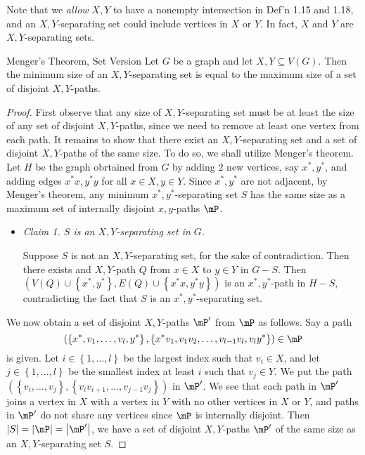 \documentclass[co342]{subfiles}
\begin{document}
    \noindent Note that we \textit{allow} $X,Y$ to have a nonempty intersection in Def'n 1.15 and 1.18, and an $X,Y$-separating set could include vertices in $X$ or $Y$. In fact, $X$ and $Y$ are $X,Y$-separating sets.

    \begin{theorem}{Menger's Theorem, Set Version}
        Let $G$ be a graph and let $X,Y\subseteq V\left( G \right)$. Then the minimum size of an $X,Y$-separating set is equal to the maximum size of a set of disjoint $X,Y$-paths.
    \end{theorem}

    \begin{proof}
        First observe that any size of $X,Y$-separating set must be at least the size of any set of disjoint $X,Y$-paths, since we need to remove at least one vertex from each path. It remains to show that there exist an $X,Y$-separating set and a set of disjoint $X,Y$-paths of the same size. To do so, we shall utilize Menger's theorem. Let $H$ be the graph obrtained from $G$ by adding $2$ new vertices, say $x^{*},y^{*}$, and adding edges $x^{*}x, y^{*}y$ for all $x\in X, y\in Y$. Since $x^{*},y^{*}$ are not adjacent, by Menger's theorem, any minimum $x^{*},y^{*}$-separating set $S$ has the same size as a maximum set of internally disjoint $x,y$-paths $\mP$.
        \begin{itemize}
            \item \textit{Claim 1. $S$ is an $X,Y$-separating set in $G$.}

                \begin{subproof}
                    Suppose $S$ is not an $X,Y$-separating set, for the sake of contradiction. Then there exists and $X,Y$-path $Q$ from $x\in X$ to $y\in Y$ in $G-S$. Then $\left( V\left( Q \right)\cup\left\lbrace x^{*},y^{*} \right\rbrace, E\left( Q \right)\cup\left\lbrace x^{*}x,y^{*}y \right\rbrace \right)$ is an $x^{*},y^{*}$-path in $H-S$, contradicting the fact that $S$ is an $x^{*},y^{*}$-separating set.
                \end{subproof}
        \end{itemize} 
        We now obtain a set of disjoint $X,Y$-paths $\mP'$ from $\mP$ as follows. Say a path 
        \begin{equation*}
            \left( \left\lbrace x^{*},v_1,\ldots,v_l,y^{*} \right\rbrace, \left\lbrace x^{*}v_1,v_1v_2,\ldots,v_{l-1}v_l,v_ly^{*} \right\rbrace \right)\in\mP 
        \end{equation*}
        is given. Let $i\in\left\lbrace 1,\ldots,l \right\rbrace$ be the largest index such that $v_i\in X$, and let $j\in\left\lbrace 1,\ldots,l \right\rbrace$ be the smallest index at least $i$ such that $v_j\in Y$. We put the path $\left( \left\lbrace v_i,\ldots,v_j \right\rbrace, \left\lbrace v_iv_{i+1},\ldots,v_{j-1}v_j \right\rbrace \right)$ in $\mP'$. We see that each path in $\mP'$ joins a vertex in $X$ with a vertex in $Y$ with no other vertices in $X$ or $Y$, and paths in $\mP'$ do not share any vertices since $\mP$ is internally disjoint. Then $\left| S \right|=\left| \mP \right|=\left| \mP' \right|$, we have a set of disjoint $X,Y$-paths $\mP'$ of the same size as an $X,Y$-separating set $S$.
    \end{proof}
\end{document}
